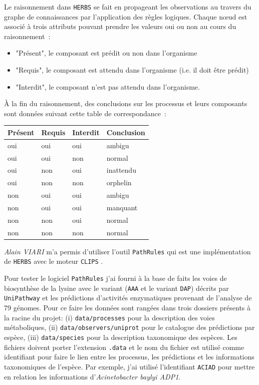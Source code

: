 \begin{refsegment}
Le raisonnement dans \texttt{HERBS} se fait en propageant les observations au travers du graphe de connaissances par l’application des règles logiques. Chaque nœud est associé à trois attributs pouvant prendre les valeurs oui ou non au cours du raisonnement :\nolisttopbreak
\begin{itemize}
	\item "Présent", le composant est prédit ou non dans l’organisme
	\item "Requis", le composant est attendu dans l’organisme (i.e. il doit être prédit)
	\item "Interdit", le composant n’est pas attendu dans l’organisme.
\end{itemize}

À la fin du raisonnement, des conclusions sur les processus et leurs composants sont données suivant cette table de correspondance :\nolisttopbreak
\begin{table}[H]
	\centering
	\begin{tabular}{|l|l|l|>{\columncolor{LightCyan}}l|}
		\toprule
		\rowcolor{LightCyan}
		\textbf{Présent} & \textbf{Requis} & \textbf{Interdit} & \textbf{Conclusion} \\ 
		\midrule
		oui & oui & oui & ambigu \\ 
		\hline 
		oui & oui & non & normal \\ 
		\hline 
		oui & non & oui & inattendu \\ 
		\hline 
		oui & non & non & orphelin \\ 
		\hline 
		non & oui & oui & ambigu \\ 
		\hline 
		non & oui & oui & manquant \\ 
		\hline 
		non & non & oui & normal \\ 
		\hline 
		non & non & non & normal \\ 
		\bottomrule
	\end{tabular} 
\end{table}

\textit{Alain VIARI} m'a permis d'utiliser l'outil \texttt{PathRules} qui est une implémentation de \texttt{\gls{HERBS}} avec le moteur \texttt{\gls{CLIPS}} \cite{riley1991clips}.


Pour tester le logiciel \texttt{PathRules} j'ai fourni à la base de faits les voies de biosynthèse de la lysine avec le variant (\texttt{AAA} et le variant \texttt{DAP}) décrits par \texttt{UniPathway} et les prédictions d’activités enzymatiques provenant de l’analyse de 79 génomes. Pour ce faire les données sont rangées dans trois dossiers présents à la racine du projet: (i) \texttt{data/processes} pour la description des voies métaboliques, (ii) \texttt{data/observers/uniprot} pour le catalogue des prédictions par espèce, (iii) \texttt{data/species} pour la description taxonomique des espèces. Les fichiers doivent porter l'extension \texttt{.data} et le nom du fichier est utilisé comme identifiant pour faire le lien entre les processus, les prédictions et les informations taxonomiques de l'espèce. Par exemple, j'ai utilisé l'identifiant \texttt{ACIAD} pour mettre en relation les informations d'\textit{Acinetobacter baylyi ADP1}.


\end{refsegment}
